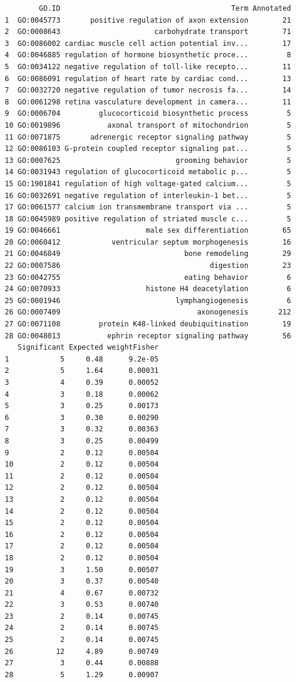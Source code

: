 \documentclass[]{article}
\begin{document}
\begin{verbatim}
        GO.ID                                        Term Annotated
1  GO:0045773       positive regulation of axon extension        21
2  GO:0008643                      carbohydrate transport        71
3  GO:0086002 cardiac muscle cell action potential inv...        17
4  GO:0046885 regulation of hormone biosynthetic proce...         8
5  GO:0034122 negative regulation of toll-like recepto...        11
6  GO:0086091 regulation of heart rate by cardiac cond...        13
7  GO:0032720 negative regulation of tumor necrosis fa...        14
8  GO:0061298 retina vasculature development in camera...        11
9  GO:0006704         glucocorticoid biosynthetic process         5
10 GO:0019896           axonal transport of mitochondrion         5
11 GO:0071875       adrenergic receptor signaling pathway         5
12 GO:0086103 G-protein coupled receptor signaling pat...         5
13 GO:0007625                           grooming behavior         5
14 GO:0031943 regulation of glucocorticoid metabolic p...         5
15 GO:1901841 regulation of high voltage-gated calcium...         5
16 GO:0032691 negative regulation of interleukin-1 bet...         5
17 GO:0061577 calcium ion transmembrane transport via ...         5
18 GO:0045989 positive regulation of striated muscle c...         5
19 GO:0046661                    male sex differentiation        65
20 GO:0060412            ventricular septum morphogenesis        16
21 GO:0046849                             bone remodeling        29
22 GO:0007586                                   digestion        23
23 GO:0042755                             eating behavior         6
24 GO:0070933                    histone H4 deacetylation         6
25 GO:0001946                           lymphangiogenesis         6
26 GO:0007409                                axonogenesis       212
27 GO:0071108         protein K48-linked deubiquitination        19
28 GO:0048013           ephrin receptor signaling pathway        56
   Significant Expected weightFisher
1            5     0.48      9.2e-05
2            5     1.64      0.00031
3            4     0.39      0.00052
4            3     0.18      0.00062
5            3     0.25      0.00173
6            3     0.30      0.00290
7            3     0.32      0.00363
8            3     0.25      0.00499
9            2     0.12      0.00504
10           2     0.12      0.00504
11           2     0.12      0.00504
12           2     0.12      0.00504
13           2     0.12      0.00504
14           2     0.12      0.00504
15           2     0.12      0.00504
16           2     0.12      0.00504
17           2     0.12      0.00504
18           2     0.12      0.00504
19           3     1.50      0.00507
20           3     0.37      0.00540
21           4     0.67      0.00732
22           3     0.53      0.00740
23           2     0.14      0.00745
24           2     0.14      0.00745
25           2     0.14      0.00745
26          12     4.89      0.00749
27           3     0.44      0.00888
28           5     1.29      0.00907
\end{verbatim}
\end{document}
